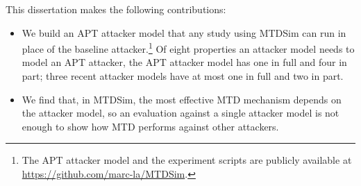 \documentclass{cshonours}
\begin{document}
\noindent This dissertation makes the following contributions:
\begin{itemize}[align=left, leftmargin=3em, labelwidth=2.5em,
                labelsep=0.5em, topsep=0.5\baselineskip, partopsep=0pt]
  \item We build an APT attacker model that any study using MTDSim can run
  in place of the baseline attacker.\footnote{The APT attacker model and
  the experiment scripts are publicly available at
  \url{https://github.com/marc-la/MTDSim}.} Of eight properties an attacker
  model needs to model an APT attacker, the APT attacker model has one in
  full and four in part; three recent attacker models have at most one in
  full and two in part.
  \item We find that, in MTDSim, the most effective MTD mechanism depends
  on the attacker model, so an evaluation against a single attacker model is
  not enough to show how MTD performs against other attackers.
\end{itemize}
\end{document}

